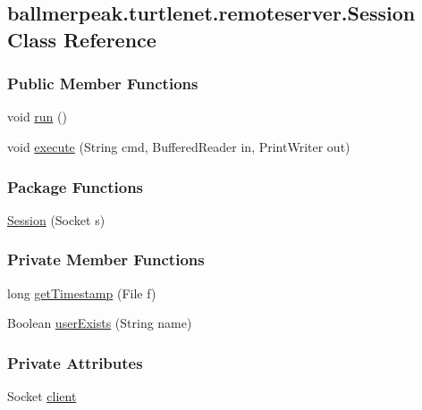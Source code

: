 \hypertarget{classballmerpeak_1_1turtlenet_1_1remoteserver_1_1Session}{\subsection{ballmerpeak.\-turtlenet.\-remoteserver.\-Session Class Reference}
\label{classballmerpeak_1_1turtlenet_1_1remoteserver_1_1Session}
}
\subsubsection*{Public Member Functions}
\begin{DoxyCompactItemize}
\item 
void \hyperlink{classballmerpeak_1_1turtlenet_1_1remoteserver_1_1Session_a5109a88ef4f77fa6419f80df207a08d9}{run} ()
\item 
void \hyperlink{classballmerpeak_1_1turtlenet_1_1remoteserver_1_1Session_adb3abede1d8a8751ad7bcc89439721db}{execute} (String cmd, Buffered\-Reader in, Print\-Writer out)
\end{DoxyCompactItemize}
\subsubsection*{Package Functions}
\begin{DoxyCompactItemize}
\item 
\hyperlink{classballmerpeak_1_1turtlenet_1_1remoteserver_1_1Session_a31ba0e5f5755afc2f26dfac1e344b371}{Session} (Socket s)
\end{DoxyCompactItemize}
\subsubsection*{Private Member Functions}
\begin{DoxyCompactItemize}
\item 
long \hyperlink{classballmerpeak_1_1turtlenet_1_1remoteserver_1_1Session_a5b7f50eb21d441fee5f67637c9c8d4b5}{get\-Timestamp} (File f)
\item 
Boolean \hyperlink{classballmerpeak_1_1turtlenet_1_1remoteserver_1_1Session_ae149d39f26b4a47b7ae7751921249f76}{user\-Exists} (String name)
\end{DoxyCompactItemize}
\subsubsection*{Private Attributes}
\begin{DoxyCompactItemize}
\item 
Socket \hyperlink{classballmerpeak_1_1turtlenet_1_1remoteserver_1_1Session_a2506d1b24e158edf2fcfd2a31d57f43a}{client}
\end{DoxyCompactItemize}


